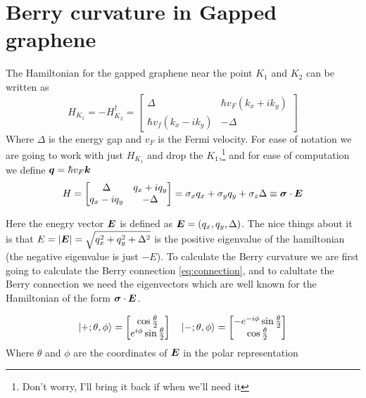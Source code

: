 \section{Berry curvature in Gapped graphene}

The Hamiltonian for the gapped graphene near the point $K_1$ and $K_2$ can be written as 
\begin{equation}
    H_{K_1}=-H_{K_2}^\dagger=
    \begin{bmatrix}
        \Delta & \hbar v_F(k_x+ik_y)\\
        \hbar v_f(k_x-ik_y)& -\Delta
    \end{bmatrix}
\end{equation}
Where $\Delta$ is the energy gap and $v_F$ is the Fermi velocity. For ease of notation we are going to work with just $H_{K_1}$ and drop the $K_1$,\footnote{Don't worry, I'll bring it back if when we'll need it} and for ease of computation we define $\boldsymbol{q}=\hbar v_F\boldsymbol{k}$
\begin{equation}
    H=
    \begin{bmatrix}
        \Delta & q_x+iq_y\\
        q_x-iq_y& -\Delta
    \end{bmatrix}=
    \sigma_x q_x + \sigma_y q_y + \sigma_z \Delta \equiv  \boldsymbol \sigma \cdot \boldsymbol{E}
\end{equation}

Here the enegry vector $\boldsymbol{E}$ is defined as $\boldsymbol{E} =( q_x,q_y,\Delta)$. The nice things about it is that $E=|\boldsymbol{E}|=\sqrt{q_x^2+q_y^2+\Delta^2}$ is the positive eigenvalue of the hamiltonian (the negative eigenvalue is just $-E$).\newline
To calculate the Berry curvature we are first going to calculate the Berry connection \ref{eq:connection}, and to calultate the Berry connection we need the eigenvectors which are well known for the Hamiltonian of the form $\boldsymbol \sigma \cdot \boldsymbol{E}$.

\begin{equation}
    \ket{+;\theta,\phi}=
    \begin{bmatrix}
        \cos{\frac \theta 2}\\
        e^{i\phi}\sin{\frac \theta 2}
    \end{bmatrix}
    \quad
    \ket{-;\theta,\phi}=
    \begin{bmatrix}
        -e^{-i\phi}\sin{\frac \theta 2}\\
        \cos{\frac \theta 2}
    \end{bmatrix}
\end{equation}
Where $\theta$ and $\phi$ are the coordinates of $\boldsymbol{E}$ in the polar representation

